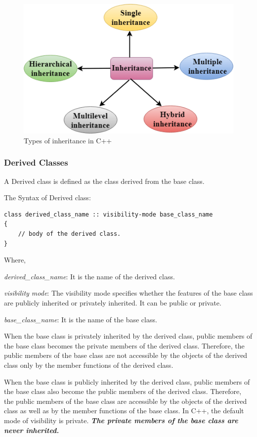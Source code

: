 \documentclass{book}
\begin{document}
\begin{figure}%
\centering
\includegraphics[width=\columnwidth]{cpp-inheritance}%
\caption{Types of inheritance in C++}%
\label{}%
\end{figure}

\subsubsection{Derived Classes}

A Derived class is defined as the class derived from the base class.

The Syntax of Derived class:

\begin{lstlisting} 
class derived_class_name :: visibility-mode base_class_name  
{  
    // body of the derived class.  
}  
\end{lstlisting}

Where,

\textit{derived\_class\_name}: It is the name of the derived class.

\textit{visibility mode}: The visibility mode specifies whether the features of the base class are publicly inherited or privately inherited. It can be public or private.

\textit{base\_class\_name}: It is the name of the base class.

When the base class is privately inherited by the derived class, public members of the base class becomes the private members of the derived class. Therefore, the public members of the base class are not accessible by the objects of the derived class only by the member functions of the derived class.

When the base class is publicly inherited by the derived class, public members of the base class also become the public members of the derived class. Therefore, the public members of the base class are accessible by the objects of the derived class as well as by the member functions of the base class. In C++, the default mode of visibility is private. \textit{\textbf{The private members of the base class are never inherited.}}
\end{document}
